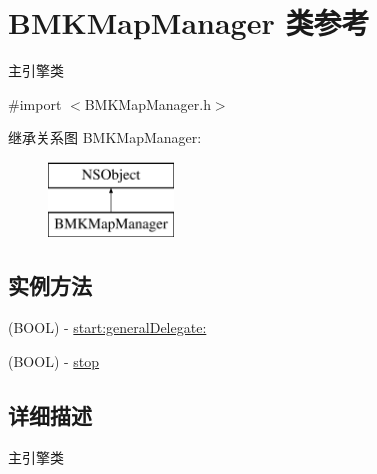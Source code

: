 \hypertarget{interface_b_m_k_map_manager}{\section{B\-M\-K\-Map\-Manager 类参考}
\label{interface_b_m_k_map_manager}
}


主引擎类  




{\ttfamily \#import $<$B\-M\-K\-Map\-Manager.\-h$>$}

继承关系图 B\-M\-K\-Map\-Manager\-:\begin{figure}[H]
\begin{center}
\leavevmode
\includegraphics[height=2.000000cm]{interface_b_m_k_map_manager}
\end{center}
\end{figure}
\subsection*{实例方法}
\begin{DoxyCompactItemize}
\item 
(B\-O\-O\-L) -\/ \hyperlink{interface_b_m_k_map_manager_a95edf9c8fea4c61a79098641c4e9a50f}{start\-:general\-Delegate\-:}
\item 
(B\-O\-O\-L) -\/ \hyperlink{interface_b_m_k_map_manager_ac53850202f5017ff35c8933c171be0f1}{stop}
\end{DoxyCompactItemize}


\subsection{详细描述}
主引擎类 

